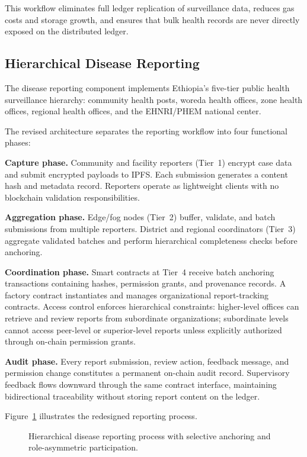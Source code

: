 \documentclass[AMA,LATO1COL]{WileyNJD-v2}
\begin{document}
This workflow eliminates full ledger replication of surveillance data, reduces gas costs and storage growth, and ensures that bulk health records are never directly exposed on the distributed ledger.

\subsection{Hierarchical Disease Reporting}\label{subsec:reporting}

The disease reporting component implements Ethiopia's five-tier public health surveillance hierarchy: community health posts, woreda health offices, zone health offices, regional health offices, and the EHNRI/PHEM national center.

The revised architecture separates the reporting workflow into four functional phases:

\textbf{Capture phase.} Community and facility reporters (Tier~1) encrypt case data and submit encrypted payloads to IPFS. Each submission generates a content hash and metadata record. Reporters operate as lightweight clients with no blockchain validation responsibilities.

\textbf{Aggregation phase.} Edge/fog nodes (Tier~2) buffer, validate, and batch submissions from multiple reporters. District and regional coordinators (Tier~3) aggregate validated batches and perform hierarchical completeness checks before anchoring.

\textbf{Coordination phase.} Smart contracts at Tier~4 receive batch anchoring transactions containing hashes, permission grants, and provenance records. A factory contract instantiates and manages organizational report-tracking contracts. Access control enforces hierarchical constraints: higher-level offices can retrieve and review reports from subordinate organizations; subordinate levels cannot access peer-level or superior-level reports unless explicitly authorized through on-chain permission grants.

\textbf{Audit phase.} Every report submission, review action, feedback message, and permission change constitutes a permanent on-chain audit record. Supervisory feedback flows downward through the same contract interface, maintaining bidirectional traceability without storing report content on the ledger.

Figure~\ref{fig:reporting} illustrates the redesigned reporting process.

\begin{figure}[!ht]
\centering
{}
\caption{Hierarchical disease reporting process with selective anchoring and role-asymmetric participation.}\label{fig:reporting}
\end{figure}
\end{document}
